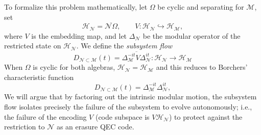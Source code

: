 \documentclass[a4paper,11pt]{article}
\theoremstyle{definition}
\newcommand{\mN}{\mathcal{N}}
\newcommand{\mH}{\mathcal{H}}
\newcommand{\mM}{\mathcal{M}}
\begin{document}
To formalize this problem mathematically, let $\Omega$ be cyclic and separating for $\mM$, set
\begin{equation}
    \mH_{\mN}=\overline{\mN\Omega},
    \qquad
    V:\mH_{\mN}\hookrightarrow\mH_{\mM} ,
\end{equation}
where $V$ is the embedding map, and let $\Delta_{\mN}$ be the modular operator of the restricted state on $\mH_{\mN}$.  We define the {\it subsystem flow}
\begin{equation}
    D_{\mN\subset\mM}(t)
    =
    \overline{\Delta_{\mM}^{-it}V\Delta_{\mN}^{it}}:\mH_{\mN}\to \mH_{\mM}
    \label{eq:intro-compressed-flow}
\end{equation}
When $\Omega$ is cyclic for both algebras, $\mH_{\mN}=\mH_{\mM}$ and this reduces to Borchers' characteristic function \cite{revolutionizing}
\begin{equation}
    D_{\mN\subset\mM}(t)
    =
    \Delta_{\mM}^{-it}\Delta_{\mN}^{it},
    \label{eq:intro-subsystem-flow}
\end{equation}
We will argue that by factoring out the intrinsic modular motion, the subsystem flow isolates precisely the failure of the subsystem to evolve autonomously; i.e., the failure of the encoding $V$ (code subspace is $V\mH_{\mN}$) to protect against the restriction to $\mN$ as an erasure QEC code.
\end{document}
